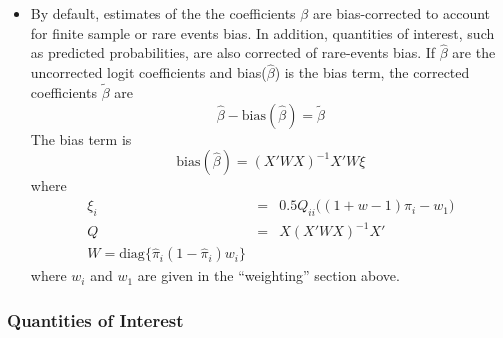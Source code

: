 \begin{itemize}
\item By default, estimates of the the coefficients $\beta$ are
  bias-corrected to account for finite sample or rare events bias.  In
  addition, quantities of interest, such as predicted probabilities,
  are also corrected of rare-events bias.  If $\widehat{\beta}$ are
the uncorrected logit coefficients and bias($\widehat{\beta}$) is the
bias term, the corrected coefficients $\tilde{\beta}$ are
\begin{equation*}
\widehat{\beta} - \textrm{bias}(\widehat{\beta}) = \tilde{\beta}
\end{equation*}
The bias term is
\begin{equation*}
\textrm{bias}(\widehat{\beta}) = (X'WX)^{-1} X'W \xi
\end{equation*}
where
\begin{eqnarray*}
\xi_i &=& 0.5 Q_{ii} \Big( (1 + w-1)\widehat{\pi}_i - w_1 \Big) \\
Q &=& X(X'WX)^{-1} X' \\
W = \textrm{diag}\{\widehat{\pi}_i (1 - \widehat{\pi}_i) w_i\}
\end{eqnarray*}
where $w_i$ and $w_1$ are given in the ``weighting'' section above.  
\end{itemize}

\subsubsection{Quantities of Interest}

